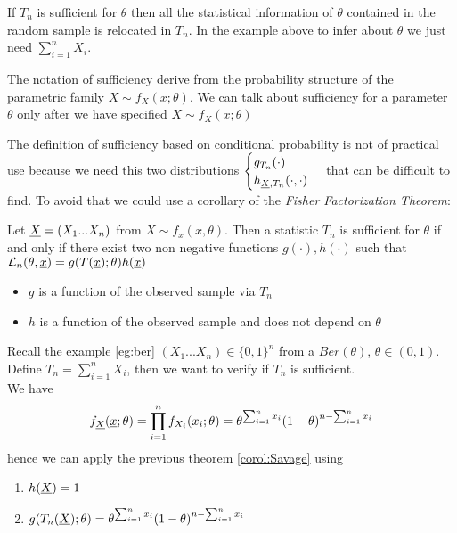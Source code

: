 \begin{oss}
	If $T_n$ is sufficient for $\theta$ then all the statistical information of $\theta$ contained in the random sample is relocated in $T_n$. In the example above to infer about $\theta$ we just need $\sum_{i=1}^{n}X_i$.\\
\end{oss}
\begin{oss}
	The notation of sufficiency derive from the probability structure of the parametric family $X\sim f_X(x;\theta)$. We can talk about sufficiency for a parameter $\theta$ only after we have specified $X\sim f_X(x;\theta)$
\end{oss}
The definition of sufficiency based on conditional probability is not of practical use because we need this two distributions $
\begin{cases}
g_{T_n}(\cdot)\\
h_{\underline X,T_n}(\cdot,\cdot)
\end{cases}
$ that can be difficult to find.
To avoid that we could use a corollary of the \textit{Fisher Factorization Theorem}:
\begin{corol}\label{corol:Savage}
	Let $\underline X=(X_1... X_n)$ from $X\sim f_x(x,\theta)$. Then a statistic $T_n$ is sufficient for $\theta$ if and only if there exist two non negative functions $g(\cdot), h(\cdot)$ such that $\mathcal{L}_n(\theta,\underline x)=g(T(\underline x);\theta)h(\underline x)$
\end{corol}
\begin{oss}
	\begin{itemize}
		\item $g$ is a function of the observed sample via $T_n$
		\item $h$ is a function of the observed sample and does not depend on $\theta$
 	\end{itemize}
\end{oss}
\begin{eg}
	Recall the example \ref{eg:ber} 
		$(X_1... X_n)\in \{0,1\}^n$ from a $Ber(\theta)$, $\theta \in (0,1)$.\\
	Define $T_n=\sum_{i=1}^{n}X_i$, then we want to verify if $T_n$ is sufficient. \\
	We have
	 $$f_{\underline X}(\underline x;\theta) = \prod_{i=1}^{n} f_{{X_i}}(x_i;\theta)=\theta^{\sum_{i=1}^{n}x_i}(1-\theta)^{n-\sum_{i=1}^{n}x_i}$$
	hence we can apply the previous theorem \ref{corol:Savage} using 
	\begin{enumerate}
		\item $h(\underline X)=1$ \item $g(T_n(\underline X);\theta)=\theta^{\sum_{i=1}^{n}x_i}(1-\theta)^{n-\sum_{i=1}^{n}x_i}$
	\end{enumerate}
\end{eg}
